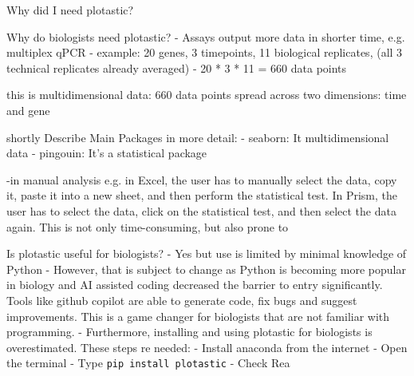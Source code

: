 


Why did I need plotastic?


Why do biologists need plotastic?
- Assays output more data in shorter time, e.g. multiplex qPCR
- example: 20 genes, 3 timepoints, 11 biological replicates, (all 3
technical replicates already averaged)
- 20 * 3 * 11 = 660 data points

this is multidimensional data:  660 data points spread across two dimensions: time
and gene

shortly Describe Main Packages in more detail:
- seaborn: It multidimensional data
- pingouin: It's a statistical package

-in manual analysis e.g. in Excel, the user has to manually select the
data, copy it, paste it into a new sheet, and then perform the
statistical test. In Prism, the user has to select the data, click on
the statistical test, and then select the data again. This is not only
time-consuming, but also prone to








Is plotastic useful for biologists?
- Yes but use is limited by minimal knowledge of Python
- However, that is subject to change as Python is becoming more popular
in biology and AI assisted coding decreased the barrier to entry
significantly. Tools like github copilot are able to generate code, fix
bugs and suggest improvements. This is a game changer for biologists
that are not familiar with programming.
- Furthermore, installing and using plotastic for biologists is overestimated. These
steps re needed:
- Install anaconda from the internet
- Open the terminal
- Type \texttt{pip install plotastic}
- Check Rea
